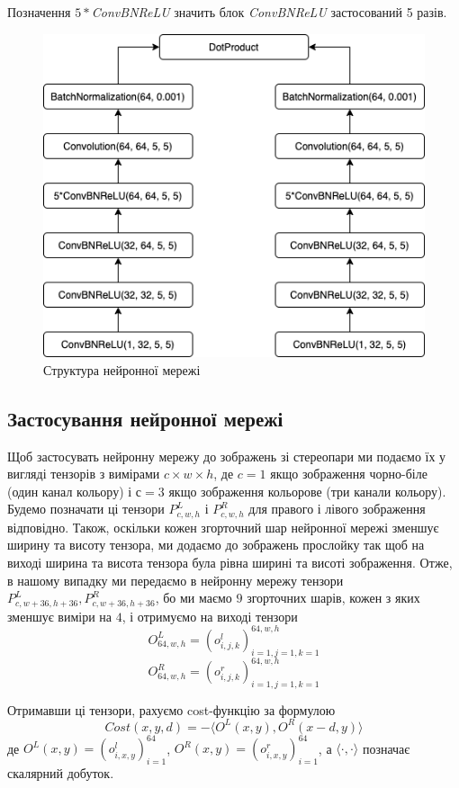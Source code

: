 \documentclass{article}
\theoremstyle{definition}
\begin{document}
Позначення $5*$\textit{ConvBNReLU} значить блок \textit{ConvBNReLU} застосований 5 разів.
	
\begin{figure}[h]
	\includegraphics[width=\linewidth]{nn_structure_prod}
	\centering
	\caption{Структура нейронної мережі}
	\label{fig:nn_structure}
\end{figure}

\subsection{Застосування нейронної мережі}
Щоб застосувать нейронну мережу до зображень зі стереопари ми подаємо їх у вигляді тензорів з вимірами $c \times w \times h$, де $c=1$ якщо зображення чорно-біле (один канал кольору) і $с=3$ якщо зображення кольорове (три канали кольору). Будемо позначати ці тензори $P^L_{c, w, h}$ і $P^R_{c, w, h}$ для правого і лівого зображення відповідно. Також, оскільки кожен згорточний шар нейронної мережі зменшує ширину та висоту тензора, ми додаємо до зображень прослойку так щоб на виході ширина та висота тензора була рівна ширині та висоті зображення. Отже, в нашому випадку ми передаємо в нейронну мережу тензори $P^L_{c, w+36, h+36}, P^R_{c, w+36, h+36}$, бо ми маємо $9$ згорточних шарів, кожен з яких зменшує виміри на $4$, і отримуємо на виході тензори
\[ O^L_{64, w, h} = (o^l_{i,j,k})_{i=1,j=1,k=1}^{64,w,h} \]
\[ O^R_{64, w, h} = (o^r_{i,j,k})_{i=1,j=1,k=1}^{64,w,h} \]


Отримавши ці тензори, рахуємо cost-функцію за формулою
\[ Cost(x, y, d) = - \langle O^L(x, y), O^R(x - d, y) \rangle \]
де $O^L(x, y) = (o^l_{i,x,y})_{i=1}^{64}$, $O^R(x, y) = (o^r_{i,x,y})_{i=1}^{64}$, а $\langle \cdot, \cdot \rangle$ позначає скалярний добуток.
\end{document}

